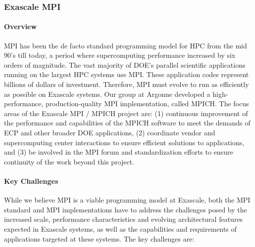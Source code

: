 \subsubsection{ Exascale MPI} \label{subsubsect:mpich}
\paragraph{Overview}

MPI has been the de facto standard programming model for HPC from the
mid 90's till today, a period where supercomputing performance
increased by six orders of magnitude.  The vast majority of DOE's
parallel scientific applications running on the largest HPC systems
use MPI.  These application codes represent billions of dollars of
investment.  Therefore, MPI must evolve to run as efficiently as
possible on Exascale systems.  Our group at Argonne developed a
high-performance, production-quality MPI implementation, called MPICH.
The focus areas of the Exascale MPI / MPICH project are: (1)
continuous improvement of the performance and capabilities of the
MPICH software to meet the demands of ECP and other broader DOE
applications, (2) coordinate vendor and supercomputing center
interactions to ensure efficient solutions to applications, and (3) be
involved in the MPI forum and standardization efforts to ensure
continuity of the work beyond this project.


\paragraph{Key  Challenges}

While we believe MPI is a viable programming model at Exascale, both
the MPI standard and MPI implementations have to address the
challenges posed by the increased scale, performance characteristics
and evolving architectural features expected in Exascale systems, as
well as the capabilities and requirements of applications targeted at
these systems.  The key challenges are:

